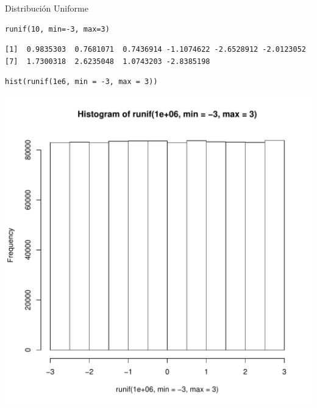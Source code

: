 \documentclass[xcolor={usenames,svgnames,dvipsnames}]{beamer}
\begin{document}
\begin{frame}[fragile,label=sec-3-5]{Distribución Uniforme}
 \lstset{language=R,label= ,caption= ,numbers=none}
\begin{lstlisting}
runif(10, min=-3, max=3)
\end{lstlisting}

\begin{verbatim}
[1]  0.9835303  0.7681071  0.7436914 -1.1074622 -2.6528912 -2.0123052
[7]  1.7300318  2.6235048  1.0743203 -2.8385198
\end{verbatim}


\lstset{language=R,label= ,caption= ,numbers=none}
\begin{lstlisting}
hist(runif(1e6, min = -3, max = 3))
\end{lstlisting}

\includegraphics[height=0.6\textheight]{figs/runif.pdf}
\end{frame}
\end{document}
